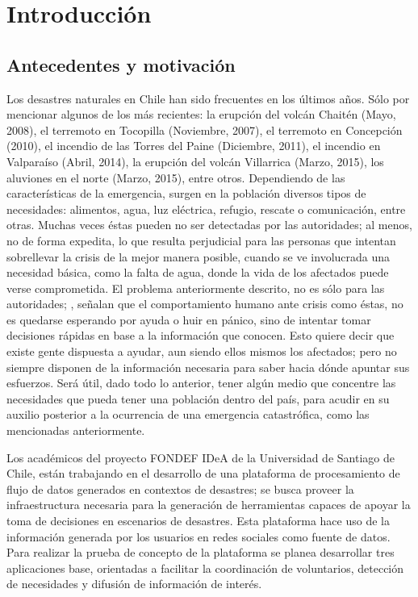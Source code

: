 \chapter{Introducción}
\label{cap:introduccion}

\section{Antecedentes y motivación}
\label{intro:motivacion}

Los desastres naturales en Chile han sido frecuentes en los últimos años. Sólo por mencionar algunos de los más recientes: la erupción del volcán Chaitén (Mayo, 2008), el terremoto en Tocopilla (Noviembre, 2007), el terremoto en Concepción (2010), el incendio de las Torres del Paine (Diciembre, 2011), el incendio en Valparaíso (Abril, 2014), la erupción del volcán Villarrica (Marzo, 2015), los aluviones en el norte (Marzo, 2015), entre otros. Dependiendo de las características de la emergencia, surgen en la población diversos tipos de necesidades: alimentos, agua, luz eléctrica, refugio, rescate o comunicación, entre otras. Muchas veces éstas pueden no ser detectadas por las autoridades; al menos, no de forma expedita, lo que resulta perjudicial para las personas que intentan sobrellevar la crisis de la mejor manera posible, cuando se ve involucrada una necesidad básica, como la falta de agua, donde la vida de los afectados puede verse comprometida. El problema anteriormente descrito, no es sólo para las autoridades; \cite{ChatoSurvey}, señalan que el comportamiento humano ante crisis como éstas, no es quedarse esperando por ayuda o huir en pánico, sino de intentar tomar decisiones rápidas en base a la información que conocen. Esto quiere decir que existe gente dispuesta a ayudar, aun siendo ellos mismos los afectados; pero no siempre disponen de la información necesaria para saber hacia dónde apuntar sus esfuerzos. Será útil, dado todo lo anterior, tener algún medio que concentre las necesidades que pueda tener una población dentro del país, para acudir en su auxilio posterior a la ocurrencia de una emergencia catastrófica, como las mencionadas anteriormente.

Los académicos del proyecto FONDEF IDeA de la Universidad de Santiago de Chile, están trabajando en el desarrollo de una plataforma de procesamiento de flujo de datos generados en contextos de desastres; se busca proveer la infraestructura necesaria para la generación de herramientas capaces de apoyar la toma de decisiones en escenarios de desastres. Esta plataforma hace uso de la información generada por los usuarios en redes sociales como fuente de datos. Para realizar la prueba de concepto de la plataforma se planea desarrollar tres aplicaciones base, orientadas a facilitar la coordinación de voluntarios, detección de necesidades y difusión de información de interés.

